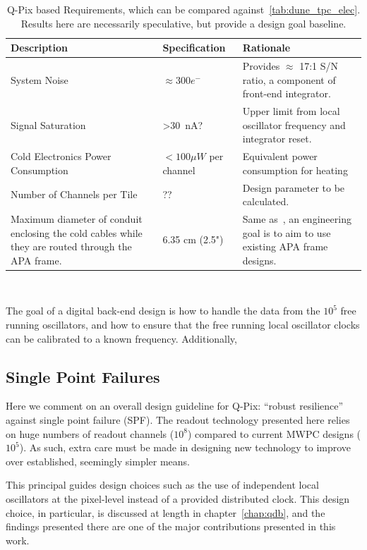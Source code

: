 \begin{table}
\begin{center}
\begin{tabular}{|| p{50mm} | p{50mm} | p{50mm} ||}
 \hline
 Description & Specification & Rationale \\ [0.5ex]
 \hline\hline
  System Noise & $\approx 300 e^{-}$ & Provides $\approx$ 17:1 S/N ratio, a component of front-end integrator. \\
 \hline
  Signal Saturation & >30~\unit{nA}? & Upper limit from local oscillator frequency and integrator reset. \\
 \hline
  Cold Electronics Power Consumption &  $< 100 \unit{\mu W}$ per channel & Equivalent power consumption for heating \\
 \hline
  Number of Channels per Tile & ?? &  Design parameter to be calculated. \\
 \hline
  Maximum diameter of conduit enclosing the cold cables while they are routed through the APA frame. & 6.35 cm (2.5") & Same as~\citep{DUNE-FD_TDRv4:Abi_2020}, an engineering goal is to aim to use existing APA frame designs. \\
 \hline
\end{tabular}
\caption{Q-Pix based Requirements, which can be compared against~\ref{tab:dune_tpc_elec}. Results here are necessarily speculative, but provide a design goal baseline.}
\end{center}
\end{table}~\label{tab:qpix_tpc_elec}

The goal of a digital back-end design is how to handle the data from the $10^{5}$ free running oscillators, and how to ensure that the free running local oscillator clocks can be calibrated to a known frequency.
Additionally,

\subsection{Single Point Failures}

Here we comment on an overall design guideline for Q-Pix: ``robust resilience'' against single point failure (SPF).
The readout technology presented here relies on huge numbers of readout channels ($10^{8}$) compared to current MWPC designs ($10^{5}$).
As such, extra care must be made in designing new technology to improve over established, seemingly simpler means.

This principal guides design choices such as the use of independent local oscillators at the pixel-level instead of a provided distributed clock.
This design choice, in particular, is discussed at length in chapter~\ref{chap:qdb}, and the findings presented there are one of the major contributions presented in this work.

